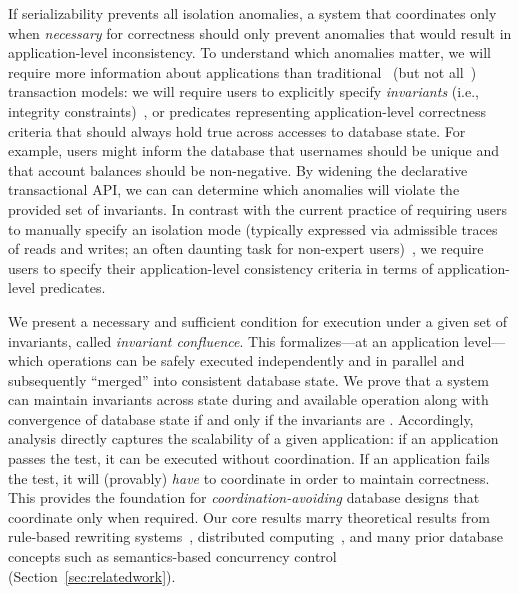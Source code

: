 
If serializability prevents all isolation anomalies, a system that
coordinates only when \textit{necessary} for correctness should only
prevent anomalies that would result in application-level
inconsistency. To understand which anomalies matter, we will require
more information about applications than
traditional~\cite{bernstein-book,gray-virtues} (but not
all~\cite{eswaran-consistency,korth-serializability,decomp-semantics,garciamolina-semantics})
transaction models: we will require users to explicitly specify
\textit{invariants} (i.e., integrity constraints)~\cite{traiger-tods},
or predicates representing application-level correctness criteria that
should always hold true across accesses to database state. For
example, users might inform the database that usernames should be
unique and that account balances should be non-negative. By widening
the declarative transactional API, we can can determine which
anomalies will violate the provided set of invariants. In contrast
with the current practice of requiring users to manually specify an
isolation mode (typically expressed via admissible traces of reads and
writes; an often daunting task for non-expert
users)~\cite{consistency-borders}, we require users to specify their
application-level consistency criteria in terms of application-level
predicates.

We present a necessary and sufficient condition for \cfree execution
under a given set of invariants, called \textit{invariant
  confluence}. This \iconfluence formalizes---at an application
level---which operations can be safely executed independently and in
parallel and subsequently ``merged'' into consistent database
state. We prove that a system can maintain invariants across state
during \cfree and available operation along with convergence of
database state if and only if the invariants are
\iconfluent. Accordingly, \iconfluence analysis directly captures the
scalability of a given application: if an application passes the test,
it can be executed without coordination. If an application fails
the \iconfluence test, it will (provably) \textit{have} to coordinate
in order to maintain correctness. This provides the foundation for
\textit{coordination-avoiding} database designs that coordinate only
when required. Our core results marry theoretical results from
rule-based rewriting systems~\cite{obs-confluence}, distributed
computing~\cite{herlihy-apologizing,gilbert-cap,hat-vldb}, and many
prior database concepts such as semantics-based concurrency
control~\cite{sdd1,decomp-semantics,badrinath-semantics,garciamolina-semantics,korth-serializability,atomictransactions,weihl-thesis}
(Section~\ref{sec:relatedwork}).


